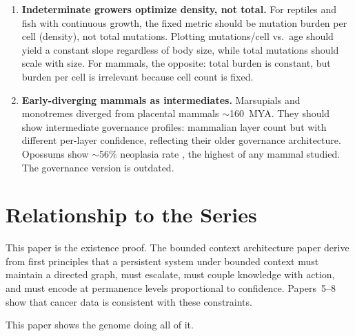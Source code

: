 \documentclass[11pt]{article}
\theoremstyle{definition}
\begin{document}
\begin{enumerate}
\item \textbf{Indeterminate growers optimize density, not total.}
   For reptiles and fish with continuous growth, the fixed metric
   should be mutation burden per cell (density), not total mutations.
   Plotting mutations/cell vs.\ age should yield a constant slope
   regardless of body size, while total mutations should scale with
   size. For mammals, the opposite: total burden is constant, but
   burden per cell is irrelevant because cell count is fixed.

\item \textbf{Early-diverging mammals as intermediates.} Marsupials
   and monotremes diverged from placental mammals $\sim$160~MYA.
   They should show intermediate governance profiles: mammalian layer
   count but with different per-layer confidence, reflecting their
   older governance architecture. Opossums show $\sim$56\% neoplasia
   rate \cite{Vincze2024}, the highest of any mammal studied. The
   governance version is outdated.
\end{enumerate}

\section{Relationship to the Series}
\label{sec:series}

This paper is the existence proof. The bounded context architecture paper derive from first
principles that a persistent system under bounded context must
maintain a directed graph, must escalate, must couple knowledge with
action, and must encode at permanence levels proportional to
confidence. Papers~5--8 show that cancer data is consistent with
these constraints.

This paper shows the genome doing all of it.
\end{document}
